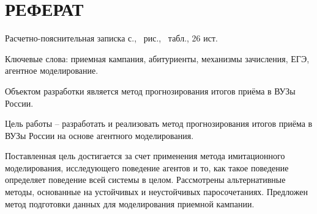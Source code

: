 \section*{РЕФЕРАТ}

Расчетно-пояснительная записка \pageref{LastPage} с., \totalfigures\ рис., \totaltables\ табл., 26 ист.

Ключевые слова: приемная кампания, абитуриенты, механизмы зачисления, ЕГЭ, агентное моделирование.


Объектом разработки является метод прогнозирования итогов приёма в ВУЗы России.

Цель работы – разработать и реализовать метод прогнозирования итогов приёма в ВУЗы России на основе агентного моделирования.

Поставленная цель достигается за счет применения метода имитационного моделирования, исследующего поведение агентов и то, как такое поведение определяет поведение всей системы в целом. Рассмотрены альтернативные методы, основанные на устойчивых и неустойчивых паросочетаниях. Предложен метод подготовки данных для моделирования приемной кампании. 

\pagebreak